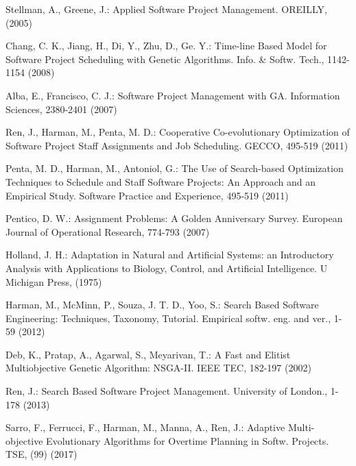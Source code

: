 
\vspace{-1mm}
\begin{thebibliography}{}
\vspace{-3mm}

Stellman, A., Greene, J.:
Applied Software Project Management.
OREILLY, (2005)

Chang, C. K., Jiang, H., Di, Y., Zhu, D., Ge. Y.:
Time-line Based Model for Software Project Scheduling with Genetic Algorithms.
Info. \& Softw. Tech., 1142-1154 (2008)

Alba, E., Francisco, C. J.:
Software Project Management with GA.
Information Sciences, 2380-2401 (2007)

Ren, J., Harman, M., Penta, M. D.:
Cooperative Co-evolutionary Optimization of Software 
Project Staff Assignments and Job Scheduling.
GECCO, 495-519 (2011)

Penta, M. D., Harman, M., Antoniol, G.:
The Use of Search-based Optimization Techniques to 
Schedule and Staff Software Projects: An Approach and an Empirical Study. 
Software Practice and Experience, 495-519 (2011)

Pentico, D. W.:
Assignment Problems: A Golden Anniversary Survey.
European Journal of Operational Research, 774-793 (2007)

Holland, J. H.:
Adaptation in Natural and Artificial Systems: an Introductory 
Analysis with Applications to Biology, Control, and Artificial Intelligence.
U Michigan Press, (1975)

Harman, M., McMinn, P., Souza, J. T. D., Yoo, S.:
Search Based Software Engineering: Techniques, Taxonomy, Tutorial.
Empirical softw. eng. and ver., 1-59 (2012)

Deb, K., Pratap, A., Agarwal, S., Meyarivan, T.:
A Fast and Elitist Multiobjective Genetic Algorithm: NSGA-II.
IEEE TEC, 182-197 (2002)

Ren, J.:
Search Based Software Project Management.
University of London., 1-178 (2013)

Sarro, F., Ferrucci, F., Harman, M., Manna, A., Ren, J.:
Adaptive Multi-objective Evolutionary Algorithms for Overtime Planning in Softw. Projects.
TSE, (99) (2017)


\end{thebibliography}

